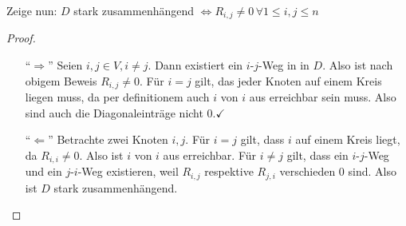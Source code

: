 \documentclass[a4paper,10pt,german]{scrartcl}
\newcommand{\gdw}{\ensuremath{\Leftrightarrow}}
\newcommand{\dann}{\ensuremath{\Rightarrow}}
\begin{document}
Zeige nun: $D$ stark zusammenhängend \gdw $R_{i,j}\neq0\,\forall 1\leq i,j\leq n$
\begin{proof}~
\begin{itemize}
 \item[``$\dann$'']
 Seien $i,j\in V, i\neq j$. Dann existiert ein $i$-$j$-Weg in in $D$. Also ist nach obigem Beweis $R_{i,j}\neq 0$.
 Für $i=j$ gilt, das jeder Knoten auf einem Kreis liegen muss, da per definitionem auch $i$ von $i$ aus erreichbar sein muss.
 Also sind auch die Diagonaleinträge nicht 0.\hfill$\checkmark$
 \item[``$\Leftarrow$''] Betrachte zwei Knoten $i,j$. Für $i=j$ gilt, dass $i$ auf einem Kreis liegt, da $R_{i,i}\neq 0$. Also ist $i$ von $i$ aus erreichbar.
 Für $i\neq j$ gilt, dass ein $i$-$j$-Weg und ein $j$-$i$-Weg existieren, weil $R_{i,j}$ respektive $R_{j,i}$ verschieden 0 sind. Also ist $D$ stark zusammenhängend.
\end{itemize}
\end{proof}
\end{document}
